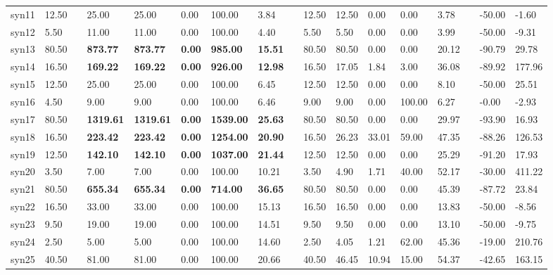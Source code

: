 \begin{table}[H]
\begin{tabularx}{\textwidth}{XXlXXXXXlXXXXXlXX}
    syn11 & 12.50 && 25.00 & 25.00 & 0.00 & 100.00 & 3.84 && 12.50 & 12.50 & 0.00 & 0.00 & 3.78 && -50.00 & -1.60\\
    syn12 & 5.50 && 11.00 & 11.00 & 0.00 & 100.00 & 4.40 && 5.50 & 5.50 & 0.00 & 0.00 & 3.99 && -50.00 & -9.31\\
    syn13 & 80.50 && \textbf{873.77} & \textbf{873.77} & \textbf{0.00} & \textbf{985.00} & \textbf{15.51} && 80.50 & 80.50 & 0.00 & 0.00 & 20.12 && -90.79 & 29.78\\
    syn14 & 16.50 && \textbf{169.22} & \textbf{169.22} & \textbf{0.00} & \textbf{926.00} & \textbf{12.98} && 16.50 & 17.05 & 1.84 & 3.00 & 36.08 && -89.92 & 177.96\\
    syn15 & 12.50 && 25.00 & 25.00 & 0.00 & 100.00 & 6.45 && 12.50 & 12.50 & 0.00 & 0.00 & 8.10 && -50.00 & 25.51\\
    syn16 & 4.50 && 9.00 & 9.00 & 0.00 & 100.00 & 6.46 && 9.00 & 9.00 & 0.00 & 100.00 & 6.27 && -0.00 & -2.93\\
    syn17 & 80.50 && \textbf{1319.61} & \textbf{1319.61} & \textbf{0.00} & \textbf{1539.00} & \textbf{25.63} && 80.50 & 80.50 & 0.00 & 0.00 & 29.97 && -93.90 & 16.93\\
    syn18 & 16.50 && \textbf{223.42} & \textbf{223.42} & \textbf{0.00} & \textbf{1254.00} & \textbf{20.90} && 16.50 & 26.23 & 33.01 & 59.00 & 47.35 && -88.26 & 126.53\\
    syn19 & 12.50 && \textbf{142.10} & \textbf{142.10} & \textbf{0.00} & \textbf{1037.00} & \textbf{21.44} && 12.50 & 12.50 & 0.00 & 0.00 & 25.29 && -91.20 & 17.93\\
    syn20 & 3.50 && 7.00 & 7.00 & 0.00 & 100.00 & 10.21 && 3.50 & 4.90 & 1.71 & 40.00 & 52.17 && -30.00 & 411.22\\
    syn21 & 80.50 && \textbf{655.34} & \textbf{655.34} & \textbf{0.00} & \textbf{714.00} & \textbf{36.65} && 80.50 & 80.50 & 0.00 & 0.00 & 45.39 && -87.72 & 23.84\\
    syn22 & 16.50 && 33.00 & 33.00 & 0.00 & 100.00 & 15.13 && 16.50 & 16.50 & 0.00 & 0.00 & 13.83 && -50.00 & -8.56\\
    syn23 & 9.50 && 19.00 & 19.00 & 0.00 & 100.00 & 14.51 && 9.50 & 9.50 & 0.00 & 0.00 & 13.10 && -50.00 & -9.75\\
    syn24 & 2.50 && 5.00 & 5.00 & 0.00 & 100.00 & 14.60 && 2.50 & 4.05 & 1.21 & 62.00 & 45.36 && -19.00 & 210.76\\
    syn25 & 40.50 && 81.00 & 81.00 & 0.00 & 100.00 & 20.66 && 40.50 & 46.45 & 10.94 & 15.00 & 54.37 && -42.65 & 163.15\\

\end{tabularx}
\end{table}
